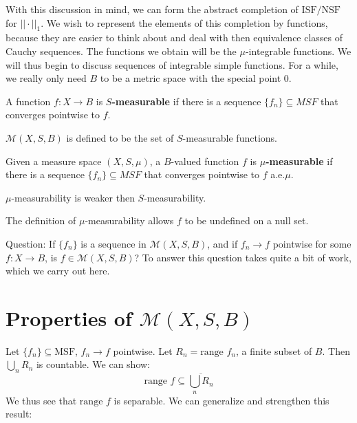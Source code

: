 \documentclass[a4paper,12pt]{report}
\newcommand{\ms}[1]{\mathscr{#1}}
\newcommand{\ovl}[1]{\overline{#1}}
\newcommand{\range}{ \text{range } }
\newcommand{\sse} {\subseteq}
\newenvironment{definition}[1][Definition.]{\begin{trivlist}
\item[\hskip \labelsep {\bfseries #1}]}{\end{trivlist}}
\newenvironment{remark}[1][Remark.]{\begin{trivlist}
\item[\hskip \labelsep {\bfseries #1}]}{\end{trivlist}}
\begin{document}
	With this discussion in mind, we can form the abstract completion of $\text{ISF} / \text{NSF}$ for $||\cdot||_1$. We wish to represent the elements of this completion by functions, because they are easier to think about and deal with then equivalence classes of Cauchy sequences. The functions we obtain will be the $\mu$-integrable functions. We will thus begin to discuss sequences of integrable simple functions. For a while, we really only need $B$ to be a metric space with the special point 0. 
	
	\begin{definition}
	A function $f : X \rightarrow B$ is \textbf{$S$-measurable} if there is a sequence $\{f_n\} \sse MSF$ that converges pointwise to $f$. 
	\end{definition}
	
	\begin{definition}
	$\ms{M}(X, S, B)$ is defined to be the set of $S$-measurable functions. 
	\end{definition}
	
	\begin{definition}
	Given a measure space $(X, S, \mu)$, a $B$-valued function $f$ is \textbf{$\mu$-measurable} if there is a sequence $\{f_n\} \sse MSF$ that converges pointwise to $f$ a.e.$\mu$.
	\end{definition}
	
	\begin{remark}
	$\mu$-measurability is weaker then $S$-measurability. 
	\end{remark}
	
	\begin{remark}
	The definition of $\mu$-measurability allows $f$ to be undefined on a null set. 
	\end{remark}

	\noindent Question: If $\{f_n\}$ is a sequence in $\ms{M}(X, S, B)$, and if $f_n \rightarrow f$ pointwise for some $f : X \rightarrow B$, is $f \in \ms{M}(X, S, B)$? To answer this question takes quite a bit of work, which we carry out here. 
	
	\section{Properties of $\ms{M}(X, S, B)$}
	
	Let $\{f_n\} \sse \text{MSF}$, $f_n \rightarrow f$ pointwise. Let $R_n = \range f_n$, a finite subset of $B$. Then $\bigcup_n R_n$ is countable. We can show:
	\[ \range f \sse \ovl{\bigcup_n R_n} \]
	We thus see that $\range f$ is separable. We can generalize and strengthen this result:	
	
\end{document}
